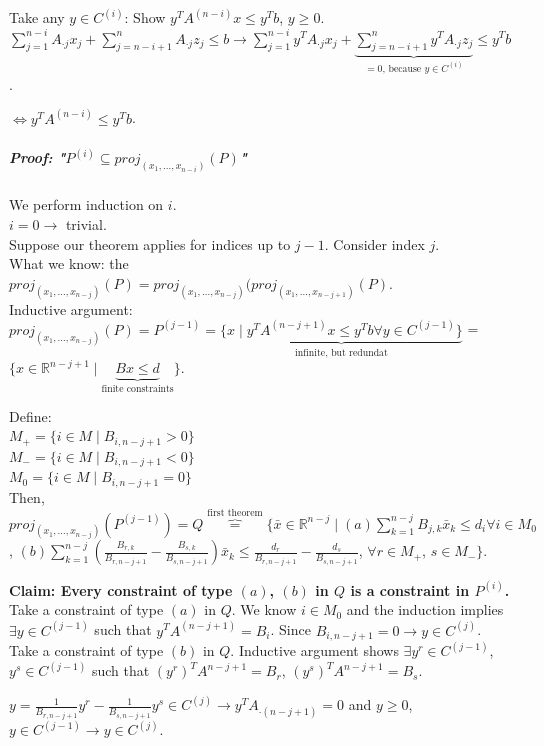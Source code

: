 \documentclass[main]{subfiles}
\begin{document}
Take any $y \in C^{(i)}$: Show $y^T A^{(n-i)} x \leq y^T b$, $y \geq 0$.
$\sum_{j=1}^{n-i} A_{\cdot j}x_j + \sum_{j = n-i + 1}^n A_{\cdot j} z_j \leq b
\rightarrow \sum_{j = 1}^{n-i} y^T A_{\cdot j} x_j +
\underbrace{\sum_{j=n-i+1}^{n} y^T A_{\cdot j} z_j}_{=0 \text{, because } y \in
C^{(i)}} \leq y^T b$.

$\iff y^T A^{(n-i)} \leq y^T b$.

\subparagraph{Proof: "$P^{(i)} \subseteq proj_{(x_1, \dots, x_{n-i})}(P)$"}

We perform induction on $i$. \\
$i = 0 \rightarrow$ trivial. \\
Suppose our theorem applies for indices up to $j-1$. Consider index $j$.\\
What we know: the $proj_{(x_1, \dots, x_{n-j})}(P) = proj_{(x_1, \dots,
x_{n-j})}(proj_{(x_1, \dots, x_{n-j+1})}(P)$.\\

Inductive argument: $proj_{(x_1, \dots, x_{n-j})}(P) = P^{(j-1)} =
\underbrace{ \{ x \mid y^T A^{(n-j+1)} x \leq y^T b \forall y \in C^{(j-1)}
\} }_{\text{infinite, but redundat}}$ = $\{x \in \mathbb{R}^{n-j+1} \mid
\underbrace{Bx \leq d}_{\text{finite constraints}} \}$.

Define:\\
$M_+ = \{i \in M \mid B_{i, n-j+1} > 0 \}$\\
$M_- = \{i \in M \mid B_{i, n-j+1} < 0 \}$\\
$M_0 = \{i \in M \mid B_{i, n-j+1} = 0 \}$\\

Then, $proj_{(x_1, \dots, x_{n-j})}(P^{(j-1)}) = Q \overbrace{=}^{\text{first
theorem}} \{ \bar{x} \in \mathbb{R}^{n-j} \mid (a) \sum_{k=1}^{n-j} B_{j,k}
\bar{x}_k \leq d_i \forall i \in M_0$, $(b) \sum_{k=1}^{n-j} (\frac{B_{r,k}}
{B_{r, n-j+1}} - \frac{B_{s,k}}{B_{s, n-j+1}}) \bar{x}_k \leq \frac{d_r}{B_{r,
n-j+1}} - \frac{d_s}{B_{s, n-j+1}}$, $\forall r \in M_+$, $s \in M_- \}$.

\textbf{Claim: Every constraint of type $(a)$, $(b)$ in $Q$ is a constraint in
$P^{(i)}$.}\\
Take a constraint of type $(a)$ in $Q$. We know $i \in M_0$ and the induction
implies $\exists y \in C^{(j-1)}$ such that $y^T A^{(n-j+1)} = B_i$. Since
$B_{i, n-j+1} = 0 \rightarrow y \in C^{(j)}$.\\

Take a constraint of type $(b)$ in $Q$. Inductive argument shows $\exists y^r
\in C^{(j-1)}$, $y^s \in C^{(j-1)}$ such that $(y^r)^T A^{n-j+1} = B_r$,
$(y^s)^T A^{n-j+1} = B_s$.

$y = \frac{1}{B_{r, n-j+1}} y^r - \frac{1}{B_{s, n-j+1}} y^s \in C^{(j)}
\rightarrow y^T A_{\cdot (n-j+1)} = 0$ and $y \geq 0$, $y \in C^{(j-1)}
\rightarrow y \in C^{(j)}$.
\end{document}
